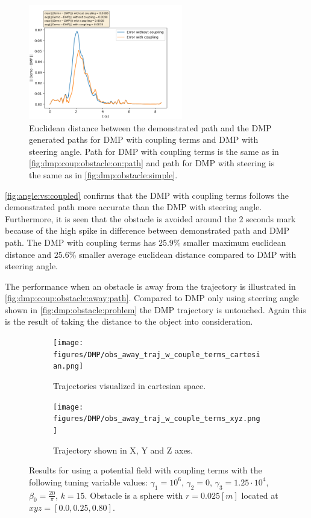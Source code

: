 \documentclass[../main.tex]{subfiles}
\begin{document}
\begin{figure}[H]
    \centering
         \includegraphics[width=0.6\textwidth]{figures/eval_trajectories/angle_based_v_couple_term.png}
     \caption{Euclidean distance between the demonstrated path and the DMP generated paths for DMP with coupling terms and DMP with steering angle. Path for DMP with coupling terms is the same as in \autoref{fig:dmp:coup:obstacle:on:path} and path for DMP with steering is the same as in \autoref{fig:dmp:obstacle:simple}.}
     \label{fig:angle:vs:coupled}
\end{figure}

\autoref{fig:angle:vs:coupled} confirms that the DMP with coupling terms follows the demonstrated path more accurate than the DMP with steering angle. Furthermore, it is seen that the obstacle is avoided around the $2$ seconds mark because of the high spike in difference between demonstrated path and DMP path. The DMP with coupling terms has $25.9 \%$ smaller maximum euclidean distance and $25.6 \%$ smaller average euclidean distance compared to DMP with steering angle.


The performance when an obstacle is away from the trajectory is illustrated in \autoref{fig:dmp:coup:obstacle:away:path}. Compared to DMP only using steering angle shown in \autoref{fig:dmp:obstacle:problem} the DMP trajectory is untouched. Again this is the result of taking the distance to the object into consideration. 

\begin{figure}[H]
    \centering
    \begin{subfigure}[b]{0.48\textwidth}
        \centering
        \texttt{[image: figures/DMP/obs\_away\_traj\_w\_couple\_terms\_cartesian.png]}
        \caption{Trajectories visualized in cartesian space.}
        \label{fig:dmp:coup:obstacle:away:path:1}
    \end{subfigure}
    \hfill
    \begin{subfigure}[b]{0.48\textwidth}
        \centering
        \texttt{[image: figures/DMP/obs\_away\_traj\_w\_couple\_terms\_xyz.png]}
        \caption{Trajectory shown in X, Y and Z axes.}
        \label{fig:dmp:coup:obstacle:away:path:2}
    \end{subfigure}
    \caption{Results for using a potential field with coupling terms with the following tuning variable values: $\gamma_1 = 10^6$,  $\gamma_2=0$, $\gamma_3=1.25\cdot10^4$, $\beta_0 = \frac{20}{\pi}$, $k=15$. Obstacle is a sphere with $r=0.025[m]$ located at  $xyz=[0.0, 0.25, 0.80]$.}
    \label{fig:dmp:coup:obstacle:away:path}
\end{figure}
\end{document}
